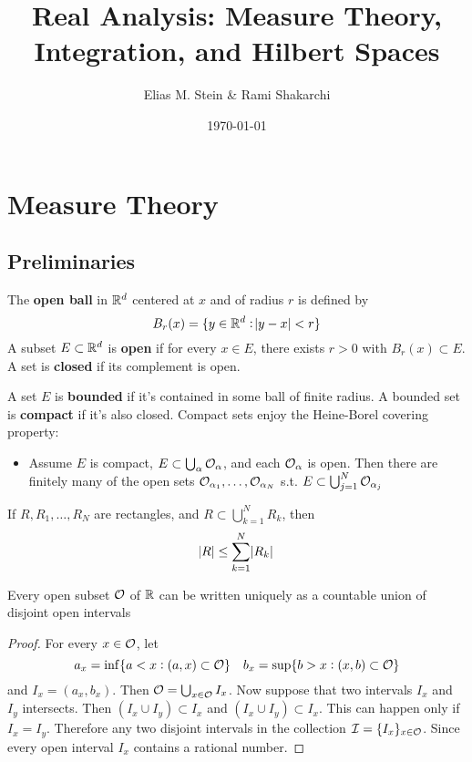 \documentclass[11pt]{article}
\author{Elias M. Stein \& Rami Shakarchi}
\date{\today}
\title{Real Analysis: Measure Theory, Integration, and Hilbert Spaces}
\begin{document}
\maketitle
\tableofcontents \clearpage
\section{Measure Theory}
\label{sec:orgf150d1e}
\subsection{Preliminaries}
\label{sec:org19077c8}
The \textbf{open ball} in \(\mathbb{R}^d\) centered at \(x\) and of radius \(r\) is defined by
\begin{equation*}
B_r(x)=\{y\in\mathbb{R}^d:\abs{y-x}<r\}
\end{equation*}
A subset \(E\subset\mathbb{R}^d\) is \textbf{open} if for every \(x\in E\), there exists \(r>0\)
with \(B_r(x)\subset E\). A set is \textbf{closed} if its complement is open.

A set \(E\) is \textbf{bounded} if it's contained in some ball of finite radius. A
bounded set is \textbf{compact} if it's also closed. Compact sets enjoy the
Heine-Borel covering property:
\begin{itemize}
\item Assume \(E\) is compact, \(E\subset\bigcup_\alpha\mathcal{O}_\alpha\), and each
\(\mathcal{O}_\alpha\) is open. Then there are finitely many of the open sets
\(\mathcal{O}_{\alpha_1},\dots,\mathcal{O}_{\alpha_N}\) s.t.
\(E\subset\bigcup_{j=1}^N\mathcal{O}_{\alpha_j}\)
\end{itemize}


\begin{lemma}[]
\label{lemma1.2}
If \(R,R_1,\dots,R_N\) are rectangles, and \(R\subset\bigcup_{k=1}^NR_k\), then
\begin{equation*}
\abs{R}\le \displaystyle\sum_{k=1}^N\abs{R_k}
\end{equation*}
\end{lemma}

\begin{theorem}[]
Every open subset \(\mathcal{O}\) of \(\mathbb{R}\) can be written uniquely as a countable
union of disjoint open intervals
\end{theorem}
\begin{proof}
For every \(x\in\mathcal{O}\), let
\begin{equation*}
a_x=\inf\{a<x:(a,x)\subset\mathcal{O}\}\quad b_x=\sup\{b>x:(x,b)\subset\mathcal{O}\}
\end{equation*}
and \(I_x=(a_x,b_x)\). Then \(\mathcal{O}=\bigcup_{x\in\mathcal{O}}I_x\). Now suppose that
two intervals \(I_x\) and \(I_y\) intersects. Then \((I_x\cup I_y)\subset I_x\) and
\((I_x\cup I_y)\subset I_x\). This can happen only if \(I_x=I_y\). Therefore any
two disjoint intervals in the collection \(\mathcal{I}=\{I_x\}_{x\in\mathcal{O}}\). Since
every open interval \(I_x\) contains a rational number.
\end{proof}
\end{document}
